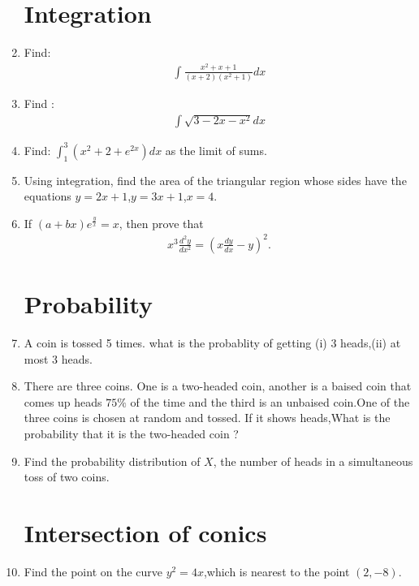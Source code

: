 \documentclass[2pt,-letter paper]{article}
\providecommand{\brak}[1]{\ensuremath{\left(#1\right)}}
\begin{document}
\begin{enumerate}
\section{Integration}
\item Find: \begin{align*}\int{\frac{x^2+x+1}{\brak{x+2}\brak{x^2+1}}}dx\end{align*}		
\item Find :                                            \begin{align*} \int{\sqrt{3 - 2x - x^2}}{dx} \end{align*}
\item Find: $\int_{1}^{3}{\brak{x^2+2+e^{2x}}}dx$ as the limit of sums.           
\item Using integration, find the area of the triangular region whose sides have the equations $y = 2x + 1$,$y= 3x + 1$,$x = 4$.
\item If $\brak{a + bx}e^\frac{y}{x}=x$, then prove that\begin{align*}                                         x^3\frac{d^2y}{dx^2} = \brak{x\frac{dy}{dx}-y}^2. \end{align*}
\section{Probability}
\item A coin is tossed 5 times. what is the probablity     of getting ({i}) 3 heads,({ii}) at most 3 heads.
\item There are three coins. One is a two-headed coin,  another is a baised coin that comes up heads $75\%$ of the time and the third is an unbaised coin.One of the three coins is chosen at random and tossed. If it shows heads,What is the probability that it is the two-headed coin ?
\item Find the probability distribution of $X$, the number of heads in a simultaneous toss of two coins.
\section{Intersection of conics}
\item Find the point on the curve $y^2 = 4x$,which is nearest to the point $\brak{2,-8}$.
\end{enumerate}
\end{document}
